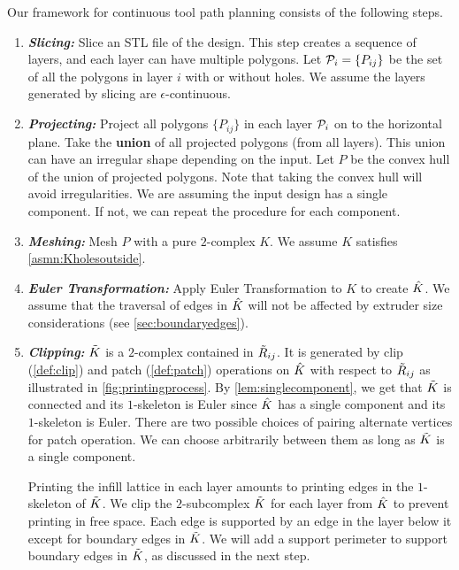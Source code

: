 Our framework for continuous tool path planning consists of the following steps.
\begin{enumerate}
  \item {\bf{\textit{Slicing:}}}
    Slice an STL file of the design.
    This step creates a sequence of layers, and each layer can have multiple polygons.
    Let $\mathcal{P}_i = \{P_{ij}\}$ be the set of all the polygons in layer $i$ with or without holes.
    We assume the layers generated by slicing are $\epsilon$-continuous.
    
  \item{\bf{\textit{Projecting:}}}
    Project all polygons $\{P_{ij}\}$ in each layer $\mathcal{P}_i$ on to the horizontal plane.
    Take the {\bfseries union} of all projected polygons (from all layers).
    This union can have an irregular shape depending on the input.
    Let $P$ be the convex hull of the union of projected polygons.
    Note that taking the convex hull will avoid irregularities.
    We are assuming the input design has a single component.
    If not, we can repeat the procedure for each component.

  \item{\bf{\textit{Meshing:}}}
    Mesh $P$ with a pure $2$-complex $K$.
    We assume $K$ satisfies \cref{asmn:Kholesoutside}.
    
  \item \label{itm:eulertransform}{\bf{\textit{Euler Transformation:}}}
    Apply Euler Transformation to $K$ to create $\hat{K}$.
    We assume that the traversal of edges in $\hat{K}$ will not be affected by extruder size considerations (see \cref{sec:boundaryedges}).
    
  \item\label{itm:patch}{\bf{\textit{Clipping:}}} 
    $\tilde{K}$ is a $2$-complex contained in $\tilde{R}_{ij}$.
    It is generated by clip (\cref{def:clip}) and patch (\cref{def:patch}) operations on $\hat{K}$ with respect to $\tilde{R}_{ij}$ as illustrated in \cref{fig:printingprocess}.
    By \cref{lem:singlecomponent}, we get that $\tilde{K}$ is connected and its $1$-skeleton is Euler since $\hat{K}$ has a single component and its $1$-skeleton is Euler. 
    There are two possible choices of pairing alternate vertices for patch operation.
    We can choose arbitrarily between them as long as $\tilde{K}$ is a single component. 
    
    Printing the infill lattice in each layer amounts to printing edges in the $1$-skeleton of $\tilde{K}$.
    We clip the $2$-subcomplex $\tilde{K}$ for each layer from $\hat{K}$ to prevent printing in free space.
    Each edge is supported by an edge in the layer below it except for boundary edges in $\tilde{K}$.
    We will add a support perimeter to support boundary edges in $\tilde{K}$, as discussed in the next step. 
      

\end{enumerate}
